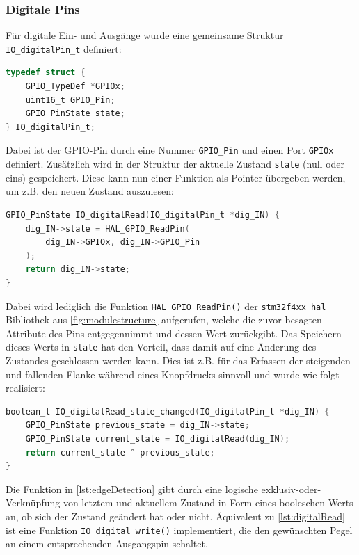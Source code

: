 \subsubsection{Digitale Pins}
Für digitale Ein- und Ausgänge wurde eine gemeinsame Struktur \verb|IO_digitalPin_t| definiert:
\begin{lstlisting}[language=C, caption={Struktur für digitale Pins}, label={lst:digitalPin}]
typedef struct {
	GPIO_TypeDef *GPIOx;
	uint16_t GPIO_Pin;
	GPIO_PinState state;
} IO_digitalPin_t;
\end{lstlisting}
Dabei ist der GPIO-Pin durch eine Nummer \verb|GPIO_Pin| und einen Port \verb|GPIOx| definiert. Zusätzlich wird in der Struktur der aktuelle Zustand \verb|state| (null oder eins) gespeichert. Diese kann nun einer Funktion als Pointer übergeben werden, um z.B. den neuen Zustand auszulesen:
\begin{lstlisting}[language=C, caption={Einlesen eines digitalen Pin-Zustands}, label={lst:digitalRead}]
GPIO_PinState IO_digitalRead(IO_digitalPin_t *dig_IN) {
	dig_IN->state = HAL_GPIO_ReadPin(
		dig_IN->GPIOx, dig_IN->GPIO_Pin
	);
	return dig_IN->state;
}
\end{lstlisting}
Dabei wird lediglich die Funktion \verb|HAL_GPIO_ReadPin()| der \verb|stm32f4xx_hal| Bibliothek aus \autoref{fig:modulestructure} aufgerufen, welche die zuvor besagten Attribute des Pins entgegennimmt und dessen Wert zurückgibt. Das Speichern dieses Werts in \verb|state| hat den Vorteil, dass damit auf eine Änderung des Zustandes geschlossen werden kann. Dies ist z.B. für das Erfassen der steigenden und fallenden Flanke während eines Knopfdrucks sinnvoll und wurde wie folgt realisiert:
\begin{lstlisting}[language=C, caption={Detektion einer Flanke}, label={lst:edgeDetection}]
boolean_t IO_digitalRead_state_changed(IO_digitalPin_t *dig_IN) {
	GPIO_PinState previous_state = dig_IN->state;
	GPIO_PinState current_state = IO_digitalRead(dig_IN);
	return current_state ^ previous_state;
}
\end{lstlisting}
Die Funktion in \autoref{lst:edgeDetection} gibt durch eine logische exklusiv-oder-Verknüpfung von letztem und aktuellem Zustand in Form eines booleschen Werts an, ob sich der Zustand geändert hat oder nicht. Äquivalent zu \autoref{lst:digitalRead} ist eine Funktion \verb|IO_digital_write()| implementiert, die den gewünschten Pegel an einem entsprechenden Ausgangspin schaltet.

